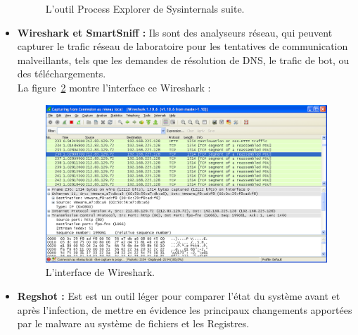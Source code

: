 \begin{itemize}
\begin{figure}[H]
\begin{center}
\caption{L'outil Process Explorer de Sysinternals suite.}
\label{fig :proexp} 
\end{center}
\end{figure}
\item \textbf{Wireshark et SmartSniff : }Ils sont des analyseurs réseau, qui peuvent capturer le trafic réseau de laboratoire pour les tentatives de communication malveillants, tels que les demandes de résolution de DNS, le trafic de bot, ou des téléchargements.\\

La figure~\ref{fig :wire} montre l'interface ce Wireshark :
\begin{figure}[H]
\begin{center}
\includegraphics[scale=0.55]{Figures/wire.png}
\caption{L'interface de Wireshark.}
\label{fig :wire} 
\end{center}
\end{figure}
\item \textbf{Regshot : }Est est un outil léger pour comparer l'état du système avant et après l'infection, de mettre en évidence les principaux changements  apportées par le malware au système de fichiers et les Registres.\\


\end{itemize}
